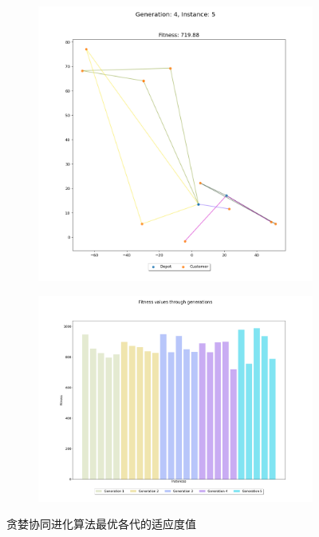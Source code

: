 \documentclass[12pt,a4paper,oneside]{ctexart}
\begin{document}
\vspace{-12pt} %

\begin{figure}[htbp]
	\centering
	\begin{subfigure}[b]{0.316\textwidth}
		\centering
		\includegraphics[width=\textwidth]{fig/7.png}
	\end{subfigure}
	\hspace{2pt} %
	\begin{subfigure}[b]{0.4\textwidth}
		\centering
		\includegraphics[width=\textwidth]{fig/8.png}
	\end{subfigure}
	\caption{贪婪协同进化算法最优各代的适应度值}
\end{figure}
\end{document}
